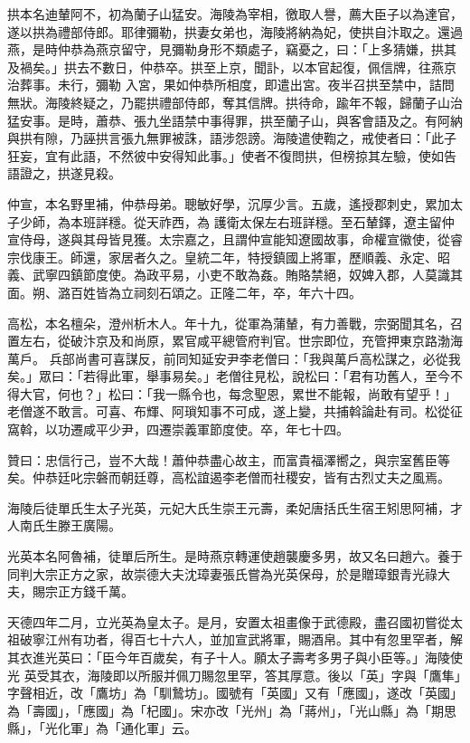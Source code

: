 \begin{pinyinscope}
 拱本名迪輦阿不，初為蘭子山猛安。海陵為宰相，徼取人譽，薦大臣子以為達官，遂以拱為禮部侍郎。耶律彌勒，拱妻女弟也，海陵將納為妃，使拱自汴取之。還過燕，是時仲恭為燕京留守，見彌勒身形不類處子，竊憂之，曰：「上多猜嫌，拱其及禍矣。」拱去不數日，仲恭卒。拱至上京，聞訃，以本官起復，佩信牌，往燕京治葬事。未行，彌勒
 入宮，果如仲恭所相度，即遣出宮。夜半召拱至禁中，詰問無狀。海陵終疑之，乃罷拱禮部侍郎，奪其信牌。拱待命，踰年不報，歸蘭子山治猛安事。是時，蕭恭、張九坐語禁中事得罪，拱至蘭子山，與客會語及之。有阿納與拱有隙，乃誣拱言張九無罪被誅，語涉怨謗。海陵遣使鞫之，戒使者曰：「此子狂妄，宜有此語，不然彼中安得知此事。」使者不復問拱，但榜掠其左驗，使如告語證之，拱遂見殺。



 仲宣，本名野里補，仲恭母弟。聰敏好學，沉厚少言。五歲，遙授郡刺史，累加太子少師，為本班詳穩。從天祚西，為
 護衛太保左右班詳穩。至石輦鐸，遼主留仲宣侍母，遂與其母皆見獲。太宗嘉之，且謂仲宣能知遼國故事，命權宣徽使，從睿宗伐康王。師還，家居者久之。皇統二年，特授鎮國上將軍，歷順義、永定、昭義、武寧四鎮節度使。為政平易，小吏不敢為姦。賄賂禁絕，奴婢入郡，人莫識其面。朔、潞百姓皆為立祠刻石頌之。正隆二年，卒，年六十四。



 高松，本名檀朵，澄州析木人。年十九，從軍為蒲輦，有力善戰，宗弼聞其名，召置左右，從破汴京及和尚原，累官咸平總管府判官。世宗即位，充管押東京路渤海萬戶。
 兵部尚書可喜謀反，前同知延安尹李老僧曰：「我與萬戶高松謀之，必從我矣。」眾曰：「若得此軍，舉事易矣。」老僧往見松，說松曰：「君有功舊人，至今不得大官，何也？」松曰：「我一縣令也，每念聖恩，累世不能報，尚敢有望乎！」老僧遂不敢言。可喜、布輝、阿瑣知事不可成，遂上變，共捕斡論赴有司。松從征窩斡，以功遷咸平少尹，四遷崇義軍節度使。卒，年七十四。



 贊曰：忠信行己，豈不大哉！蕭仲恭盡心故主，而富貴福澤嚮之，與宗室舊臣等矣。仲恭廷叱宗磐而朝廷尊，高松誼遏李老僧而社稷安，皆有古烈丈夫之風焉。



 海陵后徒單氏生太子光英，元妃大氏生崇王元壽，柔妃唐括氏生宿王矧思阿補，才人南氏生滕王廣陽。



 光英本名阿魯補，徒單后所生。是時燕京轉運使趙襲慶多男，故又名曰趙六。養于同判大宗正方之家，故崇德大夫沈璋妻張氏嘗為光英保母，於是贈璋銀青光祿大夫，賜宗正方錢千萬。



 天德四年二月，立光英為皇太子。是月，安置太祖畫像于武德殿，盡召國初嘗從太祖破寧江州有功者，得百七十六人，並加宣武將軍，賜酒帛。其中有忽里罕者，解其衣進光英曰：「臣今年百歲矣，有子十人。願太子壽考多男子與小臣等。」海陵使光
 英受其衣，海陵即以所服并佩刀賜忽里罕，答其厚意。後以「英」字與「鷹隼」字聲相近，改「鷹坊」為「馴鷙坊」。國號有「英國」又有「應國」，遂改「英國」為「壽國」，「應國」為「杞國」。宋亦改「光州」為「蔣州」，「光山縣」為「期思縣」，「光化軍」為「通化軍」云。




\end{pinyinscope}
